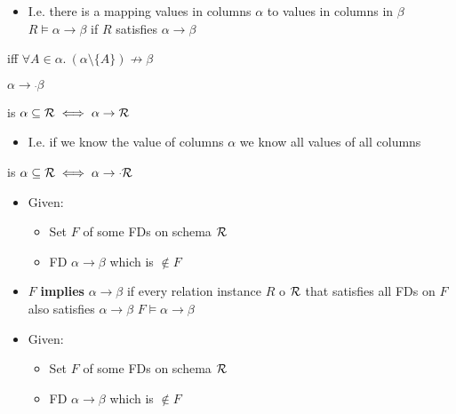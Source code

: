\begin{itemize}
\begin{itemize}
\begin{itemize}
                        \item I.e. there is a mapping values in columns $\alpha$ to values in columns in $\beta$
                         $R \models \alpha \to \beta$ if $R$ satisfies $\alpha \to \beta$
                    \end{itemize}
        \end{itemize}
         iff $\forall A \in \alpha.\ (\alpha \setminus \{A\}) \not \to \beta$
            \begin{itemize}
                 $\alpha \to \overset{.}{} \beta$
            \end{itemize}
        \begin{itemize}
             is $\alpha \subseteq \mathcal{R} \iff \alpha \to \mathcal{R}$
                \begin{itemize}
                    \item I.e. if we know the value of columns $\alpha$ we know all values of all columns
                \end{itemize}
                 is $\alpha \subseteq \mathcal{R} \iff \alpha \to \overset{.}{} \mathcal{R}$
        \end{itemize}
        \begin{itemize}
            \item Given:
                \begin{itemize}
                    \item Set $F$ of some FDs on schema $\mathcal{R}$
                    \item FD $\alpha \to \beta$ which is $\not\in F$
                \end{itemize}
            \item $F$ \textbf{implies} $\alpha \to \beta$ if every relation instance $R$ o $\mathcal{R}$ that satisfies all FDs on $F$ also satisfies $\alpha \to \beta$
             $F \models \alpha \to \beta$
        \end{itemize}
        \begin{itemize}
            \item Given:
                \begin{itemize}
                    \item Set $F$ of some FDs on schema $\mathcal{R}$
                    \item FD $\alpha \to \beta$ which is $\not\in F$

\end{itemize}
\end{itemize}
\end{itemize}
